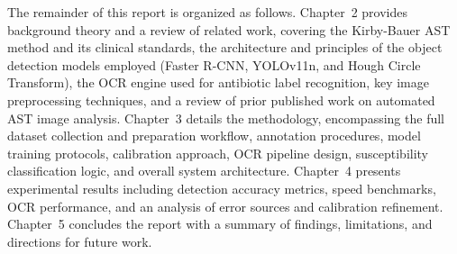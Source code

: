 The remainder of this report is organized as follows. Chapter~2 provides background theory and a
review of related work, covering the Kirby-Bauer AST method and its clinical standards, the
architecture and principles of the object detection models employed (Faster R-CNN, YOLOv11n, and
Hough Circle Transform), the OCR engine used for antibiotic label recognition, key image
preprocessing techniques, and a review of prior published work on automated AST image analysis.
Chapter~3 details the methodology, encompassing the full dataset collection and preparation
workflow, annotation procedures, model training protocols, calibration approach, OCR pipeline
design, susceptibility classification logic, and overall system architecture. Chapter~4 presents
experimental results including detection accuracy metrics, speed benchmarks, OCR performance, and
an analysis of error sources and calibration refinement. Chapter~5 concludes the report with a
summary of findings, limitations, and directions for future work.
